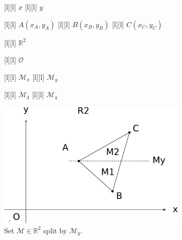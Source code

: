 \begin{figure}[ht]
	\centering
	\footnotesize

	[l] {$x$}
	[l] {$y$}

	[l] {$A(x_A,y_A)$}
	[l] {$B(x_B,y_B)$}
	[l] {$C(x_C,y_C)$}

	[l] {$\mathbb{R}^2$}

	[l] {$\mathcal{O}$}

	[l] {$\mathcal{M}_x$}
	[l] {$\mathcal{M}_y$}

	[l] {$\mathcal{M}_3$}
	[l] {$\mathcal{M}_4$}

	\includegraphics[width=0.8\textwidth]{setAinR2_Ay.eps}
	\caption{Set $\mathcal{M} \in \mathbb{R}^2$ split by $\mathcal{M}_y$.}
	\label{\LABEL}
\end{figure}
